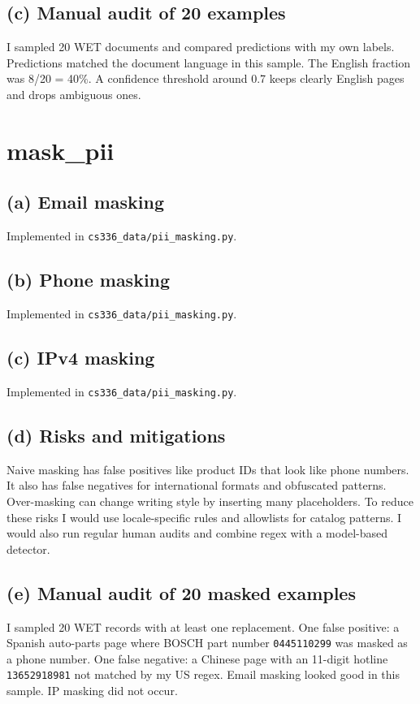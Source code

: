 \documentclass[11pt]{article}
\newcommand{\answer}[1]{#1}
\begin{document}
\subsection*{(c) Manual audit of 20 examples}
\answer{I sampled 20 WET documents and compared predictions with my own labels. Predictions matched the document language in this sample. The English fraction was 8/20 = 40\%. A confidence threshold around 0.7 keeps clearly English pages and drops ambiguous ones.}

\section{mask\_pii}
\subsection*{(a) Email masking}
\answer{Implemented in \texttt{cs336\_data/pii\_masking.py}.}

\subsection*{(b) Phone masking}
\answer{Implemented in \texttt{cs336\_data/pii\_masking.py}.}

\subsection*{(c) IPv4 masking}
\answer{Implemented in \texttt{cs336\_data/pii\_masking.py}.}

\subsection*{(d) Risks and mitigations}
\answer{Naive masking has false positives like product IDs that look like phone numbers. It also has false negatives for international formats and obfuscated patterns. Over-masking can change writing style by inserting many placeholders. To reduce these risks I would use locale-specific rules and allowlists for catalog patterns. I would also run regular human audits and combine regex with a model-based detector.}

\subsection*{(e) Manual audit of 20 masked examples}
\answer{I sampled 20 WET records with at least one replacement. One false positive: a Spanish auto-parts page where BOSCH part number \texttt{0445110299} was masked as a phone number. One false negative: a Chinese page with an 11-digit hotline \texttt{13652918981} not matched by my US regex. Email masking looked good in this sample. IP masking did not occur.}
\end{document}
